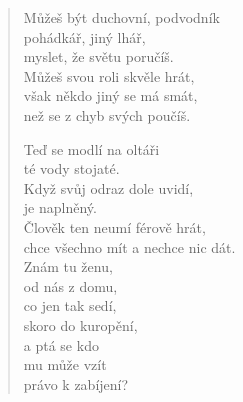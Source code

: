 \begin{verse}
 Můžeš být duchovní, podvodník \\
 pohádkář, jiný lhář, \\
 myslet, že světu poručíš. \\
 Můžeš svou roli skvěle hrát, \\
 však někdo jiný se má smát, \\
 než se z chyb svých poučíš.
 
 Teď se modlí na oltáři  \\
 té vody stojaté. \\
 Když svůj odraz dole uvidí, \\
 je naplněný. \\
 Člověk ten neumí férově hrát, \\
 chce všechno mít a nechce nic dát. \\
 Znám tu ženu, \\
 od nás z domu, \\
 co jen tak sedí, \\
 skoro do kuropění, \\
 a ptá se kdo  \\
 mu může vzít \\
 právo k zabíjení?
\end{verse}
